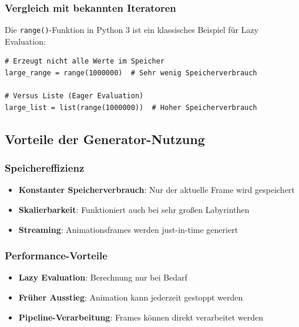 \documentclass[12pt,a4paper]{article}
\begin{document}
\subsubsection{Vergleich mit bekannten Iteratoren}

Die \texttt{range()}-Funktion in Python 3 ist ein klassisches Beispiel für Lazy Evaluation:

\begin{lstlisting}[caption={Range als Iterator}]
# Erzeugt nicht alle Werte im Speicher
large_range = range(1000000)  # Sehr wenig Speicherverbrauch

# Versus Liste (Eager Evaluation)
large_list = list(range(1000000))  # Hoher Speicherverbrauch
\end{lstlisting}

\subsection{Vorteile der Generator-Nutzung}

\subsubsection{Speichereffizienz}
\begin{itemize}
    \item \textbf{Konstanter Speicherverbrauch}: Nur der aktuelle Frame wird gespeichert
    \item \textbf{Skalierbarkeit}: Funktioniert auch bei sehr großen Labyrinthen
    \item \textbf{Streaming}: Animationsframes werden just-in-time generiert
\end{itemize}

\subsubsection{Performance-Vorteile}
\begin{itemize}
    \item \textbf{Lazy Evaluation}: Berechnung nur bei Bedarf
    \item \textbf{Früher Ausstieg}: Animation kann jederzeit gestoppt werden
    \item \textbf{Pipeline-Verarbeitung}: Frames können direkt verarbeitet werden
\end{itemize}

    
\end{document}

